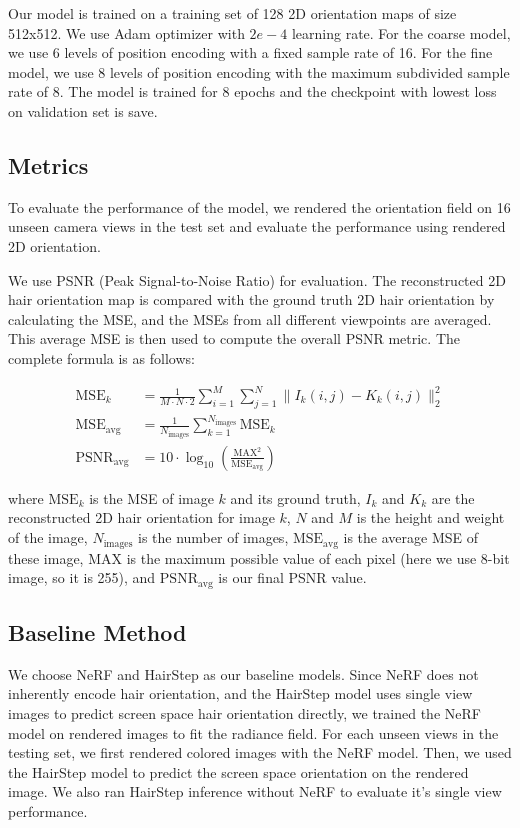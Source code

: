\documentclass{article}
\begin{document}
Our model is trained on a training set of 128 2D orientation maps of size 512x512. We use Adam optimizer with $2e-4$ learning rate. For the coarse model, we use 6 levels of position encoding with a fixed sample rate of 16. For the fine model, we use 8 levels of position encoding with the maximum subdivided sample rate of 8. The model is trained for 8 epochs and the checkpoint with lowest loss on validation set is save.

\subsection{Metrics}

To evaluate the performance of the model, we rendered the orientation field on 16 unseen camera views in the test set and evaluate the performance using rendered 2D orientation.

We use PSNR (Peak Signal-to-Noise Ratio) for evaluation. The reconstructed 2D hair orientation map is compared with the ground truth 2D hair orientation by calculating the MSE, and the MSEs from all different viewpoints are averaged. This average MSE is then used to compute the overall PSNR metric. The complete formula is as follows:

\begin{align}
    \text{MSE}_k &=
    \frac{1}{M \cdot N \cdot 2}
     \sum_{i=1}^M \sum_{j=1}^N \| I_k (i,j) - K_k(i,j)\|_2 ^2 \\
    \text{MSE}_\text{avg} &= \frac{1}{N_\text{images}} \sum_{k=1}^{N_\text{images}}\text{MSE}_k \\
    \text{PSNR}_\text{avg} &= 10 \cdot \log_{10} \left( \frac{\text{MAX}^2}{\text{MSE}_{\text{avg}}} \right)
\end{align}

where $\text{MSE}_k$ is the MSE of image $k$ and its ground truth, $I_k$ and $K_k$ are the reconstructed 2D hair orientation for image $k$, $N$ and $M$ is the height and weight of the image, $N_\text{images}$ is the number of images, $\text{MSE}_\text{avg}$ is the average MSE of these image, MAX is the maximum possible value of each pixel (here we use 8-bit image, so it is 255), and $\text{PSNR}_\text{avg}$ is our final PSNR value.

\subsection{Baseline Method}

We choose NeRF \cite{mildenhall_nerf_2020} and HairStep \cite{zheng_hairstep_2023} as our baseline models. Since NeRF does not inherently encode hair orientation, and the HairStep model uses single view images to predict screen space hair orientation directly, we trained the NeRF model on rendered images to fit the radiance field. For each unseen views in the testing set, we first rendered colored images with the NeRF model. Then, we used the HairStep model to predict the screen space orientation on the rendered image. We also ran HairStep inference without NeRF to evaluate it's single view performance.
\end{document}
